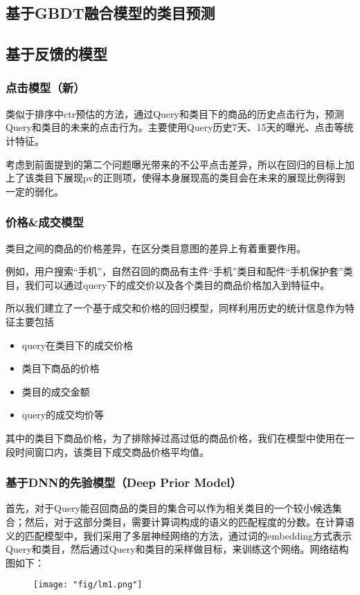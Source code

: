 \subsection{基于GBDT融合模型的类目预测}
\subsection{基于反馈的模型}
\subsubsection{点击模型（新）}
类似于排序中ctr预估的方法，通过Query和类目下的商品的历史点击行为，预测Query和类目的未来的点击行为。主要使用Query历史7天、15天的曝光、点击等统计特征。
\par 考虑到前面提到的第二个问题曝光带来的不公平点击差异，所以在回归的目标上加上了该类目下展现pv的正则项，使得本身展现高的类目会在未来的展现比例得到一定的弱化。
\subsubsection{价格\&成交模型	}
类目之间的商品的价格差异，在区分类目意图的差异上有着重要作用。
\par 例如，用户搜索“手机”，自然召回的商品有主件“手机”类目和配件“手机保护套”类目，我们可以通过query下的成交价以及各个类目的商品价格加入到特征中。
\par 所以我们建立了一个基于成交和价格的回归模型，同样利用历史的统计信息作为特征主要包括  
\begin{itemize}
\item query在类目下的成交价格
\item 类目下商品的价格
\item 类目的成交金额
\item query的成交均价等
\end{itemize}
其中的类目下商品价格，为了排除掉过高过低的商品价格，我们在模型中使用在一段时间窗口内，该类目下成交商品价格平均值。
\subsubsection{基于DNN的先验模型（Deep Prior Model）}
首先，对于Query能召回商品的类目的集合可以作为相关类目的一个较小候选集合；然后，对于这部分类目，需要计算词构成的语义的匹配程度的分数。在计算语义的匹配模型中，我们采用了多层神经网络的方法，通过词的embedding方式表示Query和类目，然后通过Query和类目的采样做目标，来训练这个网络。网络结构图如下：
\begin{figure}[!h]
	\centering
	\texttt{[image: "fig/lm1.png"]}
	\caption{}
	\label{fig:lm1}
\end{figure}

